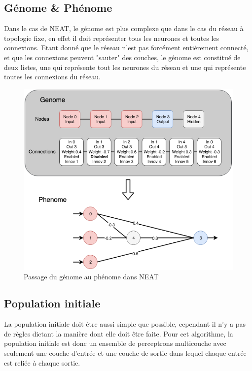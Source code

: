 \documentclass{article}
\begin{document}
\subsection{Génome \& Phénome}

Dans le cas de NEAT, le génome est plus complexe que dans le cas du réseau à topologie fixe, en effet il doit représenter tous les neurones et toutes les connexions. Etant donné que le réseau n'est pas forcément entièrement connecté, et que les connexions peuvent "sauter" des couches, le génome est constitué de deux listes, une qui représente tout les neurones du réseau et une qui représente toutes les connexions du réseau. 

\begin{figure}[H]
\begin{center}
	\includegraphics[scale=0.55]{genomephenomeneat.png}
	\caption{Passage du génome au phénome dans NEAT}
\end{center}
\end{figure}

\subsection{Population initiale}

La population initiale doit être aussi simple que possible, cependant il n'y a pas de règles dictant la manière dont elle doit être faite. Pour cet algorithme, la population initiale est donc un ensemble de perceptrons multicouche avec seulement une couche d'entrée et une couche de sortie dans lequel chaque entrée est reliée à chaque sortie.
\end{document}
